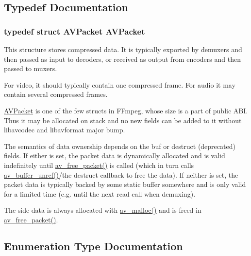 \subsection{Typedef Documentation}
\subsubsection[{\texorpdfstring{A\+V\+Packet}{AVPacket}}]{\setlength{\rightskip}{0pt plus 5cm}typedef struct {\bf A\+V\+Packet}  {\bf A\+V\+Packet}}\hypertarget{group__lavc__packet_ga0d1607e2c2c502bcd41713233553e7b8}{}\label{group__lavc__packet_ga0d1607e2c2c502bcd41713233553e7b8}
This structure stores compressed data. It is typically exported by demuxers and then passed as input to decoders, or received as output from encoders and then passed to muxers.

For video, it should typically contain one compressed frame. For audio it may contain several compressed frames.

\hyperlink{struct_a_v_packet}{A\+V\+Packet} is one of the few structs in F\+Fmpeg, whose size is a part of public A\+BI. Thus it may be allocated on stack and no new fields can be added to it without libavcodec and libavformat major bump.

The semantics of data ownership depends on the buf or destruct (deprecated) fields. If either is set, the packet data is dynamically allocated and is valid indefinitely until \hyperlink{group__lavc__packet_gae65881462e78f98b268f34661d921ee0}{av\+\_\+free\+\_\+packet()} is called (which in turn calls \hyperlink{group__lavu__buffer_ga135e9e929b5033bb8f68322497b2effc}{av\+\_\+buffer\+\_\+unref()}/the destruct callback to free the data). If neither is set, the packet data is typically backed by some static buffer somewhere and is only valid for a limited time (e.\+g. until the next read call when demuxing).

The side data is always allocated with \hyperlink{group__lavu__mem_gacbca30ebc510a7e4156d66e7aceb2dc8}{av\+\_\+malloc()} and is freed in \hyperlink{group__lavc__packet_gae65881462e78f98b268f34661d921ee0}{av\+\_\+free\+\_\+packet()}. 

\subsection{Enumeration Type Documentation}
